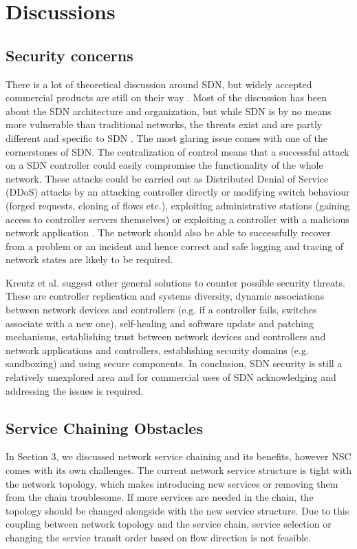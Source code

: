 \section{Discussions}

\subsection{Security concerns}

There is a lot of theoretical discussion around SDN, but widely accepted commercial products are still on their way \cite{Sorensen12}. Most of the discussion has been about the SDN architecture and organization, but while SDN is by no means more vulnerable than traditional networks, the threats exist and are partly different and specific to SDN \cite{Kreutz13}. The most glaring issue comes with one of the cornerstones of SDN. The centralization of control means that a successful attack on a SDN controller could easily compromise the functionality of the whole network. These attacks could be carried out as Distributed Denial of Service (DDoS) attacks by an attacking controller directly or modifying switch behaviour (forged requests, cloning of flows etc.), exploiting administrative stations (gaining access to controller servers themselves) or exploiting a controller with a malicious network application  \cite{Kreutz13}. The network should also be able to successfully recover from a problem or an incident and hence correct and safe logging and tracing of network states are likely to be required.

Kreutz et al. suggest other general solutions to counter possible security threats. These are controller replication and systems diversity, dynamic associations between network devices and controllers (e.g. if a controller fails, switches associate with a new one), self-healing and software update and patching mechanisms, establishing trust between network devices and controllers and network applications and controllers, establishing security domains (e.g. sandboxing) and using secure components. In conclusion, SDN security is still a relatively unexplored area and for commercial uses of SDN acknowledging and addressing the issues is required.

\subsection{Service Chaining Obstacles}

In Section 3, we discussed network service chaining and its benefits, however NSC comes with its own challenges. The current network service structure is tight with the network topology, which makes introducing new services or removing them from the chain troublesome. If more services are needed in the chain, the topology should be changed alongside with the new service structure. Due to this coupling between network topology and the service chain, service selection or changing the service transit order based on flow direction is not feasible. \cite{QN14}

